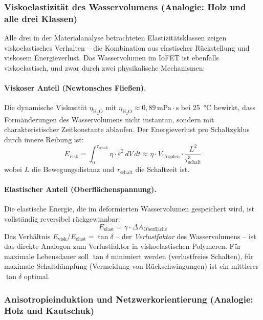 ﻿\documentclass[a4paper,12pt]{scrreprt}
\theoremstyle{definition}
\begin{document}
\subsubsection{Viskoelastizität des Wasservolumens (Analogie: Holz und alle drei Klassen)}

Alle drei in der Materialanalyse betrachteten Elastizitätsklassen zeigen
viskoelastisches Verhalten -- die Kombination aus elastischer Rückstellung
und viskosem Energieverlust. Das Wasservolumen im IoFET ist ebenfalls
viskoelastisch, und zwar durch zwei physikalische Mechanismen:

\paragraph{Viskoser Anteil (Newtonsches Fließen).}
Die dynamische Viskosität $\eta_{\mathrm{H_2O}}$ mit $\eta_{\mathrm{H_2O}} \approx 0{,}89\,\mathrm{mPa \cdot s}$
bei 25\, °C bewirkt, dass Formänderungen des Wasservolumens nicht
instantan, sondern mit charakteristischer Zeitkonstante ablaufen. Der
Energieverlust pro Schaltzyklus durch innere Reibung ist:
\begin{equation}
	E_{\mathrm{visk}} = \int_0^{\tau_{\mathrm{schalt}}} \eta \cdot \dot{\varepsilon}^2 \, dV \, dt
	\approx \eta \cdot V_{\mathrm{Tropfen}} \cdot \frac{L^2}{\tau_{\mathrm{schalt}}^3}
	\label{eq:viskose_dissipation}
\end{equation}
wobei $L$ die Bewegungsdistanz und $\tau_{\mathrm{schalt}}$ die Schaltzeit ist.

\paragraph{Elastischer Anteil (Oberflächenspannung).}
Die elastische Energie, die im deformierten Wasservolumen gespeichert wird,
ist vollständig reversibel rückgewinnbar:
\begin{equation}
	E_{\mathrm{elast}} = \gamma \cdot \Delta A_{\mathrm{Oberfläche}}
	\label{eq:elast_energie_wasser}
\end{equation}
Das Verhältnis $E_{\mathrm{visk}} / E_{\mathrm{elast}} = \tan\delta$ -- der
\emph{Verlustfaktor} des Wasservolumens -- ist das direkte Analogon zum
Verlustfaktor in viskoelastischen Polymeren. Für maximale Lebensdauer soll
$\tan\delta$ minimiert werden (verlustfreies Schalten), für maximale
Schaltdämpfung (Vermeidung von Rückschwingungen) ist ein mittlerer
$\tan\delta$ optimal.

\subsubsection{Anisotropieinduktion und Netzwerkorientierung (Analogie: Holz und Kautschuk)}
\end{document}
